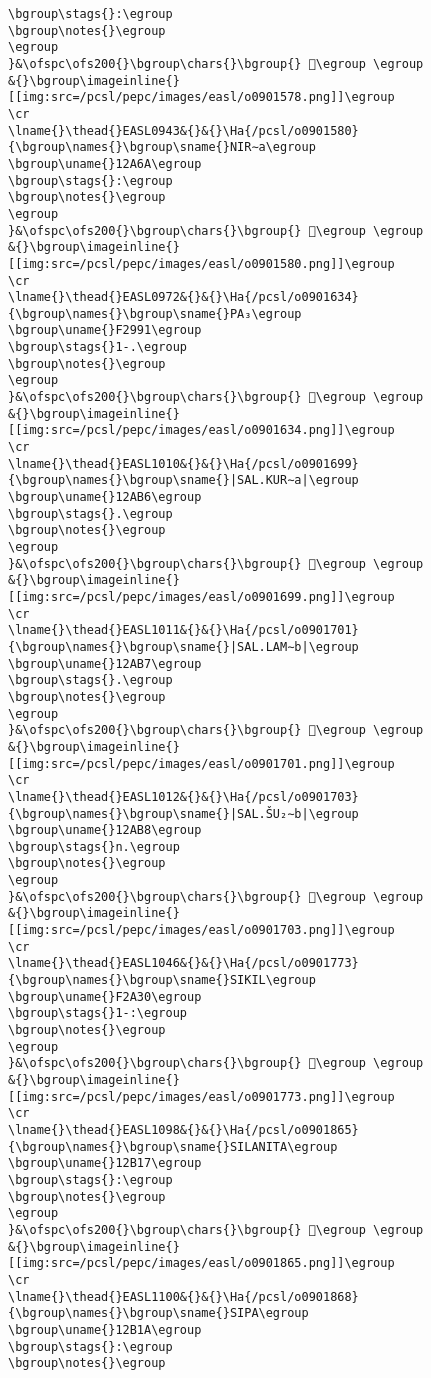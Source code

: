 \begin{verbatim}
\bgroup\stags{}:\egroup
\bgroup\notes{}\egroup
\egroup
}&\ofspc\ofs200{}\bgroup\chars{}\bgroup{} 𒩩\egroup \egroup
&{}\bgroup\imageinline{}[[img:src=/pcsl/pepc/images/easl/o0901578.png]]\egroup
\cr
\lname{}\thead{}EASL0943&{}&{}\Ha{/pcsl/o0901580}{\bgroup\names{}\bgroup\sname{}NIR∼a\egroup
\bgroup\uname{}12A6A\egroup
\bgroup\stags{}:\egroup
\bgroup\notes{}\egroup
\egroup
}&\ofspc\ofs200{}\bgroup\chars{}\bgroup{} 𒩪\egroup \egroup
&{}\bgroup\imageinline{}[[img:src=/pcsl/pepc/images/easl/o0901580.png]]\egroup
\cr
\lname{}\thead{}EASL0972&{}&{}\Ha{/pcsl/o0901634}{\bgroup\names{}\bgroup\sname{}PA₃\egroup
\bgroup\uname{}F2991\egroup
\bgroup\stags{}1-.\egroup
\bgroup\notes{}\egroup
\egroup
}&\ofspc\ofs200{}\bgroup\chars{}\bgroup{} 󲦑\egroup \egroup
&{}\bgroup\imageinline{}[[img:src=/pcsl/pepc/images/easl/o0901634.png]]\egroup
\cr
\lname{}\thead{}EASL1010&{}&{}\Ha{/pcsl/o0901699}{\bgroup\names{}\bgroup\sname{}|SAL.KUR∼a|\egroup
\bgroup\uname{}12AB6\egroup
\bgroup\stags{}.\egroup
\bgroup\notes{}\egroup
\egroup
}&\ofspc\ofs200{}\bgroup\chars{}\bgroup{} 𒪶\egroup \egroup
&{}\bgroup\imageinline{}[[img:src=/pcsl/pepc/images/easl/o0901699.png]]\egroup
\cr
\lname{}\thead{}EASL1011&{}&{}\Ha{/pcsl/o0901701}{\bgroup\names{}\bgroup\sname{}|SAL.LAM∼b|\egroup
\bgroup\uname{}12AB7\egroup
\bgroup\stags{}.\egroup
\bgroup\notes{}\egroup
\egroup
}&\ofspc\ofs200{}\bgroup\chars{}\bgroup{} 𒪷\egroup \egroup
&{}\bgroup\imageinline{}[[img:src=/pcsl/pepc/images/easl/o0901701.png]]\egroup
\cr
\lname{}\thead{}EASL1012&{}&{}\Ha{/pcsl/o0901703}{\bgroup\names{}\bgroup\sname{}|SAL.ŠU₂∼b|\egroup
\bgroup\uname{}12AB8\egroup
\bgroup\stags{}n.\egroup
\bgroup\notes{}\egroup
\egroup
}&\ofspc\ofs200{}\bgroup\chars{}\bgroup{} 𒪸\egroup \egroup
&{}\bgroup\imageinline{}[[img:src=/pcsl/pepc/images/easl/o0901703.png]]\egroup
\cr
\lname{}\thead{}EASL1046&{}&{}\Ha{/pcsl/o0901773}{\bgroup\names{}\bgroup\sname{}SIKIL\egroup
\bgroup\uname{}F2A30\egroup
\bgroup\stags{}1-:\egroup
\bgroup\notes{}\egroup
\egroup
}&\ofspc\ofs200{}\bgroup\chars{}\bgroup{} 󲨰\egroup \egroup
&{}\bgroup\imageinline{}[[img:src=/pcsl/pepc/images/easl/o0901773.png]]\egroup
\cr
\lname{}\thead{}EASL1098&{}&{}\Ha{/pcsl/o0901865}{\bgroup\names{}\bgroup\sname{}SILANITA\egroup
\bgroup\uname{}12B17\egroup
\bgroup\stags{}:\egroup
\bgroup\notes{}\egroup
\egroup
}&\ofspc\ofs200{}\bgroup\chars{}\bgroup{} 𒬗\egroup \egroup
&{}\bgroup\imageinline{}[[img:src=/pcsl/pepc/images/easl/o0901865.png]]\egroup
\cr
\lname{}\thead{}EASL1100&{}&{}\Ha{/pcsl/o0901868}{\bgroup\names{}\bgroup\sname{}SIPA\egroup
\bgroup\uname{}12B1A\egroup
\bgroup\stags{}:\egroup
\bgroup\notes{}\egroup

\end{verbatim}
